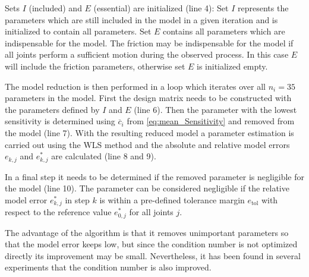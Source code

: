 Sets $I$ (included) and $E$ (essential) are initialized  (line 4): Set $I$ represents the parameters which are still included in the model in a given iteration and is initialized to contain all parameters. Set $E$ contains all parameters which are indispensable for the model. The friction may be indispensable for the model if all joints perform a sufficient motion during the observed process. In this case  $E$ will include the friction parameters, otherwise set $E$ is initialized empty.

The model reduction is then performed in a loop which iterates over all $n_i=35$ parameters in the model. First the design matrix needs to be constructed with the parameters defined by $I$ and $E$ (line 6). Then the parameter with the lowest sensitivity is determined using $\overline{c}_i$ from \eqref{eq:mean_Sensitivity} and removed from the model (line 7). With the resulting reduced model a parameter estimation is carried out using the WLS method and the absolute and relative model errors $e_{k,j}$ and $e^*_{k,j}$ are calculated (line 8 and 9).

In a final step it needs to be determined if the removed parameter is negligible for the model (line 10). The parameter can be considered negligible if the relative model error $e^*_{k,j}$ in step $k$ is within a pre-defined tolerance margin $e_{\mathrm{tol}}$ with respect to the reference value $e^*_{0,j}$ for all joints $j$.%

The advantage of the algorithm is that it removes unimportant parameters so that the model error keeps low, but since the condition number is not optimized directly its improvement may be small. Nevertheless, it has been found in several experiments that the condition number is also improved.